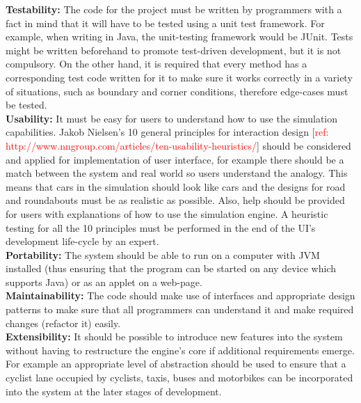 \documentclass{article}
\begin{document}
	\noindent
	\textbf{Testability:} The code for the project must be written by programmers with a fact in mind that it will have to be tested using a unit test framework. For example, when writing in Java, the unit-testing framework would be JUnit. 
	Tests might be written beforehand to promote test-driven development, but it is not compulsory. 
	On the other hand, it is required that every method has a corresponding test code written for it to make sure it works correctly in a variety of situations, such as boundary and corner conditions, therefore edge-cases must be tested.\\
	
	\noindent 
	\textbf{Usability:} It must be easy for users to understand how to use the simulation capabilities. Jakob Nielsen's 10 general principles for interaction design [\textcolor{red}{ref: http://www.nngroup.com/articles/ten-usability-heuristics/}] should be considered and applied for implementation of user interface, for example there should be a match between the system and real world so users understand the analogy. 
	This means that cars in the simulation should look like cars and the designs for road and roundabouts must be as realistic as possible. 
	Also, help should be provided for users with explanations of how to use the simulation engine. 
	A heuristic testing for all the 10 principles must be performed in the end of the UI’s development life-cycle by an expert. \\
	
	\noindent 
	\textbf{Portability:} The system should be able to run on a computer with JVM installed (thus ensuring that the program can be started on any device which supports Java) or as an applet on a web-page. \\
	
	\noindent
	\textbf{Maintainability:} The code should make use of interfaces and appropriate design patterns to make sure that all programmers can understand it and make required changes (refactor it) easily.\\
	
	\noindent 
	\textbf{Extensibility:} It should be possible to introduce new features into the system without having to restructure the engine’s core if additional requirements emerge. 
	For example an appropriate level of abstraction should be used to ensure that a cyclist lane occupied by cyclists, taxis, buses and motorbikes can be incorporated into the system at the later stages of development.\\
	
\end{document}
